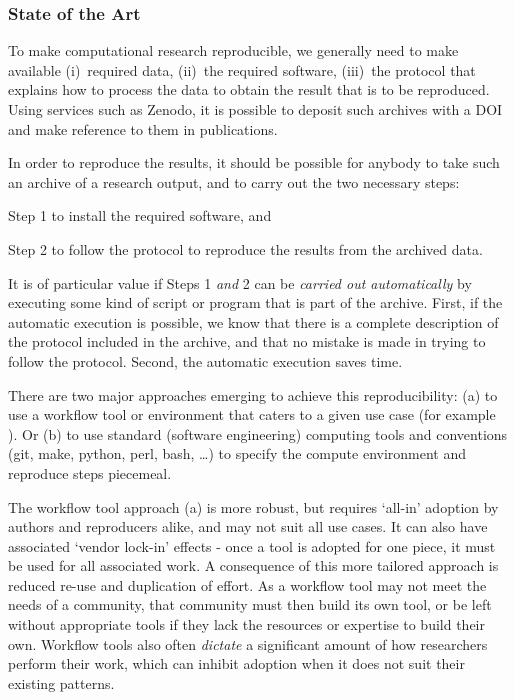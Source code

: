 \subsubsection{State of the Art}

To make computational research reproducible, we generally need to make available
(i)~required data, (ii)~the required software, (iii)~the protocol that explains
how to process the data to obtain the result that is to be reproduced. Using
services such as Zenodo, it is possible to deposit such archives with a DOI and
make reference to them in publications.

In order to reproduce the results, it should be possible for anybody to take such an archive of a research
output, and to carry out the two necessary steps:
\begin{compactitem}
\item Step 1 to install the required software, and
\item Step 2 to follow the protocol to reproduce the results from the archived data.
\end{compactitem}

It is of particular value if Steps 1 \emph{and} 2 can be \emph{carried out
  automatically} by executing some kind of script or program that is part of the
archive. First, if the automatic execution is possible, we know that there is a
complete description of the protocol included in the archive, and that no
mistake is made in trying to follow the protocol. Second, the automatic
execution saves time.

There are two major approaches emerging to achieve this reproducibility: (a) to use a
workflow tool or environment that caters to a given use case (for example
~\cite{reana2019} ). Or (b) to use standard
(software engineering) computing tools and conventions (git, make, python, perl,
bash, \ldots) to specify the compute environment and reproduce steps piecemeal.

The workflow tool approach (a) is more robust, but requires `all-in' adoption by authors and reproducers alike,
and may not suit all use cases. It can also have associated `vendor lock-in' effects
- once a tool is adopted for one piece, it must be used for all associated work.
A consequence of this more tailored approach is reduced re-use and duplication of effort.
As a workflow tool may not meet the needs of a community,
that community must then build its own tool, or be left without appropriate tools
if they lack the resources or expertise to build their own.
Workflow tools also often \emph{dictate} a significant amount of how researchers perform their work,
which can inhibit adoption when it does not suit their existing patterns.


